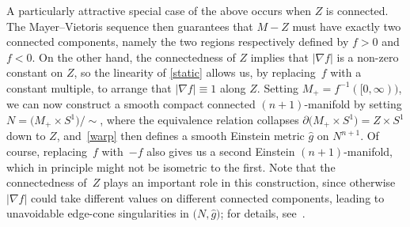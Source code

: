 \documentclass[pdftex]{sigma}
\numberwithin{equation}{section}
\begin{document}
A particularly attractive special case of the above occurs when $Z$ is connected.
The Mayer--Vietoris sequence then guarantees that $M-Z$ must have exactly two connected components, namely the two
 regions respectively defined by $f>0$ and $f< 0$. On the other hand, the connectedness of $Z$ implies that $|\nabla f|$ is a non-zero constant on $Z$,
so the linearity of \eqref{static} allows us, by replacing~$f$ with a constant multiple, to arrange that
$|\nabla f|\equiv 1$ along $Z$. Setting $M_+ = f^{-1} ([0,\infty))$, we can now construct a smooth compact connected $(n+1)$-manifold
by setting $N= \big( M_+\times S^1\big)/{\sim}$,
where the equivalence relation
collapses $\partial \big( M_+\times S^1\big)= Z\times S^1$ down to $Z$, and~\eqref{warp} then defines a smooth Einstein metric $\widehat{g}$ on $N^{n+1}$. Of course,
replacing~$f$ with~$-f$ also gives us a second Einstein $(n+1)$-manifold, which in principle might not be isometric to the first. Note that the connectedness of~$Z$ plays an important role in this construction, since otherwise $|\nabla f|$ could take different values on different connected components, leading to unavoidable
edge-cone singularities in $\big(N,\widehat{g}\big)$; for details, see~\cite{ambrozio}.
\end{document}

